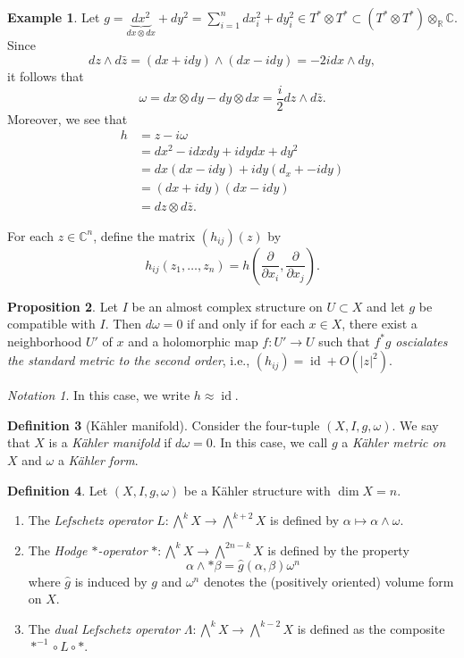 \documentclass[10pt,letterpaper,cm]{nupset}
\theoremstyle{definition}
\newtheorem{defn}{Definition}[subsection]
\newtheorem{exmp}[defn]{Example}
\theoremstyle{theorem}
\newtheorem{prop}[defn]{Proposition}
\theoremstyle{remark}
\newtheorem*{notation}{Notation}
\newcommand{\C}{\mathbb C}
\newcommand{\R}{\mathbb{R}}
\newcommand{\1}{\mathbb{1}}
\newcommand{\0}{\vec 0}
\DeclareMathOperator{\id}{id}
\newcommand{\be}{\begin{enumerate}}
\newcommand{\ee}{\end{enumerate}}
\begin{document}
\begin{exmp}
Let $g = \underbrace{d{x^2}}_{d{x}\otimes d{x}} + d{y^2} = \sum_{i=1}^nd{x_i^2} + d{y_i^2} \in T^{\ast}\otimes T^{\ast} \subset \left(T^{\ast}\otimes T^{\ast}\right)\otimes_{\R}\C$. Since
\[
d{z} \wedge d{\bar{z}} = \left(d{x} + id{y}\right) \wedge \left(d{x}- id{y}\right) = {-2id{x}}\wedge d{y}
,\]
it follows that
\[
\omega = d{x}\otimes d{y} -d{y}\otimes d{x} = \frac{i}{2}d{z} \wedge d{\bar{z}}
.\] Moreover, we see that
\begin{align*}
h & = z-i{\omega}
\\ & = d{x^2} -id{x}d{y} +id{y}d{x} +d{y}^2
\\ & = d{x}\left(d{x}-id{y}\right) + id{y}\left(d_x+-id{y}\right)
\\ & = \left(d{x} + id{y}\right)\left(d{x}-id{y}\right) 
\\ & = d{z}\otimes d{\bar{z}}.
\end{align*}
\end{exmp}

For each $z\in \C^n$, define the matrix $\left(h_{ij}\right)\left(z\right)$ by $$h_{ij}\left(z_1, \ldots, z_n\right) = h\left(\frac{\partial}{\partial{x_i}}, \frac{\partial}{\partial{x_j}}\right).$$ 

\begin{prop}
Let $I$ be an almost complex structure on $U\subset X$ and let $g$ be compatible with $I$. Then $d{\omega} =0$ if and only if for each $x\in X$, there exist a neighborhood  $U'$ of $x$ and a holomorphic map $f: U' \to U$ such that $f^{\ast}{g}$ \textit{oscialates the standard metric to the second order}, i.e., $\left(h_{ij}\right) = \id + O\left(\left\lvert{z}\right\rvert^2\right)$.
\end{prop}

\begin{notation}
In this case, we write $h \approx \id$.
\end{notation}

\begin{defn}[K\"ahler manifold]
Consider the four-tuple $\left(X, I, g, \omega\right)$.  We say that $X$ is a \textit{K\"ahler manifold} if $d{\omega}=0$. In this case, we call $g$ a \textit{K\"ahler metric on $X$} and $\omega$ a \textit{K\"ahler form}.
\end{defn}

\begin{defn}
Let $\left(X, I, g, \omega\right)$ be a K\"ahler structure with $\dim{X} =n$.
\be
\item The \textit{Lefschetz operator} $L: \bigwedge^k{X} \to \bigwedge^{k+2}{X}$ is defined by $\alpha \mapsto \alpha \wedge \omega$.
\item The \textit{Hodge $\ast$-operator} $\ast : \bigwedge^k{X} \to \bigwedge^{2n-k}{X}$  is defined by the property
\[
\alpha \wedge \ast{\beta} = \hat{g}\left(\alpha, \beta\right){\omega^n}
\] where $\hat{g}$ is induced by $g$ and $\omega^n$ denotes the (positively oriented) volume form on $X$.
\item  The \textit{dual Lefschetz operator} $\Lambda : \bigwedge^k{X} \to \bigwedge^{k-2}{X}$ is defined as the composite $\ast^{-1} \circ L\circ \ast$.
\ee
\end{defn}
\end{document}
